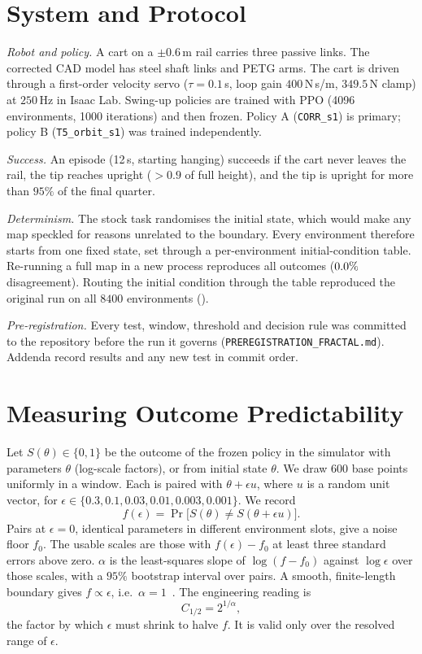 \documentclass[conference]{IEEEtran}
\begin{document}
\section{System and Protocol}\label{sec:setup}
\emph{Robot and policy.} A cart on a $\pm0.6$\,m rail carries three passive links. The corrected CAD model
has steel shaft links and PETG arms. The cart is driven through a first-order velocity servo
($\tau=0.1$\,s, loop gain $400$\,N\,s/m, $349.5$\,N clamp) at $250$\,Hz in Isaac Lab. Swing-up
policies are trained with PPO (4096 environments, 1000 iterations) and then frozen. Policy A
(\texttt{CORR\_s1}) is primary; policy B (\texttt{T5\_orbit\_s1}) was trained independently.

\emph{Success.} An episode (12\,s, starting hanging) succeeds if the cart never leaves the rail, the tip
reaches upright ($>0.9$ of full height), and the tip is upright for more than $95\%$ of the final quarter.

\emph{Determinism.} The stock task randomises the initial state, which would make any map speckled for
reasons unrelated to the boundary. Every environment therefore starts from one fixed state, set through a
per-environment initial-condition table. Re-running a full map in a new process reproduces all outcomes
($0.0\%$ disagreement). Routing the initial condition through the table reproduced the original run on
all $8400$ environments (\icMechanism).

\emph{Pre-registration.} Every test, window, threshold and decision rule was committed to the
repository before the run it governs (\texttt{PREREGISTRATION\_FRACTAL.md}). Addenda record results and
any new test in commit order.

\section{Measuring Outcome Predictability}\label{sec:method}
Let $S(\theta)\in\{0,1\}$ be the outcome of the frozen policy in the simulator with parameters
$\theta$ (log-scale factors), or from initial state $\theta$. We draw $600$ base points uniformly in a
window. Each is paired with $\theta+\epsilon u$, where $u$ is a random unit vector, for
$\epsilon\in\{0.3,0.1,0.03,0.01,0.003,0.001\}$. We record
\begin{equation}
f(\epsilon)=\Pr\big[S(\theta)\neq S(\theta+\epsilon u)\big].
\end{equation}
Pairs at $\epsilon=0$, identical parameters in different environment slots, give a noise floor $f_0$.
The usable scales are those with $f(\epsilon)-f_0$ at least three standard errors above zero. $\alpha$ is
the least-squares slope of $\log(f-f_0)$ against $\log\epsilon$ over those scales, with a $95\%$
bootstrap interval over pairs. A smooth, finite-length boundary gives $f\propto\epsilon$, i.e.\
$\alpha=1$~\cite{mcdonald1985}. The engineering reading is
\begin{equation}
C_{1/2}=2^{1/\alpha},
\end{equation}
the factor by which $\epsilon$ must shrink to halve $f$. It is valid only over the resolved range of
$\epsilon$.
\end{document}
